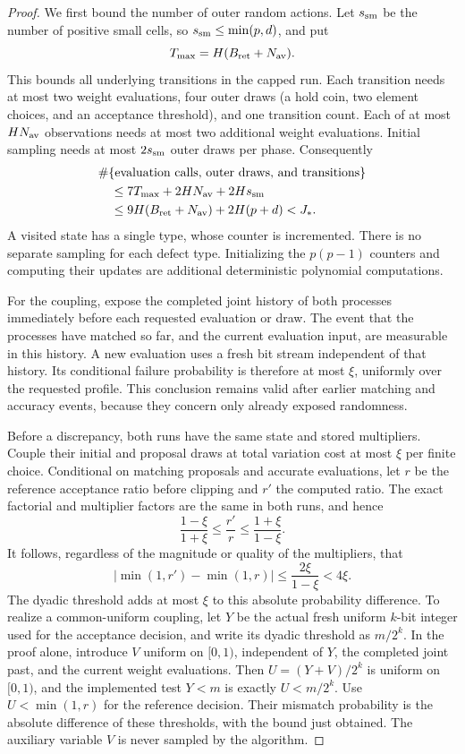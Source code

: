 \begin{proof}
We first bound the number of outer random actions.  Let
\(s_{\rm sm}\) be the number of positive small cells, so
\(s_{\rm sm}\leq\min(p,d)\), and put
\[
 T_{\max}=H(B_{\rm ret}+N_{\rm av}).
\]
This bounds all underlying transitions in the capped run.
Each transition needs at most two weight evaluations, four outer
draws (a hold coin, two element choices, and an acceptance threshold),
and one transition count.  Each of at most \(HN_{\rm av}\)
observations needs at most two additional weight evaluations.
Initial sampling needs at most \(2s_{\rm sm}\) outer draws per
phase.  Consequently
\begin{equation}
\begin{split}
 &\#\{\text{evaluation calls, outer draws, and transitions}\}\\
 &\quad\leq
 7T_{\max}+2HN_{\rm av}+2Hs_{\rm sm}\\
 &\quad\leq
 9H(B_{\rm ret}+N_{\rm av})+2H(p+d)<J_*.
\end{split}
\label{eq:alg-action-budget}
\end{equation}
A visited state has a single type, whose counter is incremented.
There is no separate sampling for each defect type.  Initializing
the \(p(p-1)\) counters and computing their updates are additional
deterministic polynomial computations.

For the coupling, expose the completed joint history of both
processes immediately before each requested evaluation or draw.
The event that the processes have matched so far, and the current
evaluation input, are measurable in this history.  A new evaluation
uses a fresh bit stream independent of that history.  Its conditional
failure probability is therefore at most \(\xi\), uniformly over
the requested profile.  This conclusion remains valid after earlier
matching and accuracy events, because they concern only already
exposed randomness.

Before a discrepancy, both runs have the same state and stored
multipliers.  Couple their initial and proposal draws at total
variation cost at most \(\xi\) per finite choice.  Conditional
on matching proposals and accurate evaluations, let \(r\) be the
reference acceptance ratio before clipping and \(r'\) the computed
ratio.  The exact factorial and multiplier factors are the same in
both runs, and hence
\[
 \frac{1-\xi}{1+\xi}\leq\frac{r'}r
 \leq\frac{1+\xi}{1-\xi}.
\]
It follows, regardless of the magnitude or quality of the
multipliers, that
\[
 \big|\min(1,r')-\min(1,r)\big|
 \leq \frac{2\xi}{1-\xi}<4\xi.
\]
The dyadic threshold adds at most \(\xi\) to this absolute
probability difference. To realize a common-uniform coupling, let
\(Y\) be the actual fresh uniform \(k\)-bit integer used for the
acceptance decision, and write its dyadic threshold as \(m/2^k\).
In the proof alone, introduce \(V\) uniform on \([0,1)\), independent
of \(Y\), the completed joint past, and the current weight evaluations.
Then \(U=(Y+V)/2^k\) is uniform on \([0,1)\), and the implemented
test \(Y<m\) is exactly \(U<m/2^k\). Use \(U<\min(1,r)\) for
the reference decision. Their mismatch probability is the absolute
difference of these thresholds, with the bound just obtained.
The auxiliary variable \(V\) is never sampled by the algorithm.


\end{proof}
